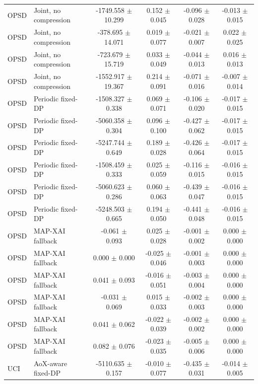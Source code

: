 \begin{table}[t]
\begin{tabular}{llcccc}
OPSD & Joint, no compression & -1749.558 $\pm$ 10.299 & 0.152 $\pm$ 0.045 & -0.096 $\pm$ 0.028 & -0.013 $\pm$ 0.015 \\
OPSD & Joint, no compression & -378.695 $\pm$ 14.071 & 0.019 $\pm$ 0.077 & -0.021 $\pm$ 0.007 & 0.022 $\pm$ 0.025 \\
OPSD & Joint, no compression & -723.679 $\pm$ 15.719 & 0.033 $\pm$ 0.049 & -0.044 $\pm$ 0.013 & 0.016 $\pm$ 0.013 \\
OPSD & Joint, no compression & -1552.917 $\pm$ 19.367 & 0.214 $\pm$ 0.091 & -0.071 $\pm$ 0.016 & -0.007 $\pm$ 0.014 \\
OPSD & Periodic fixed-DP & -1508.327 $\pm$ 0.338 & 0.069 $\pm$ 0.071 & -0.106 $\pm$ 0.020 & -0.017 $\pm$ 0.015 \\
OPSD & Periodic fixed-DP & -5060.358 $\pm$ 0.304 & 0.096 $\pm$ 0.100 & -0.427 $\pm$ 0.062 & -0.017 $\pm$ 0.015 \\
OPSD & Periodic fixed-DP & -5247.744 $\pm$ 0.649 & 0.189 $\pm$ 0.028 & -0.426 $\pm$ 0.064 & -0.017 $\pm$ 0.015 \\
OPSD & Periodic fixed-DP & -1508.459 $\pm$ 0.333 & 0.025 $\pm$ 0.059 & -0.116 $\pm$ 0.015 & -0.016 $\pm$ 0.015 \\
OPSD & Periodic fixed-DP & -5060.623 $\pm$ 0.286 & 0.060 $\pm$ 0.063 & -0.439 $\pm$ 0.047 & -0.016 $\pm$ 0.015 \\
OPSD & Periodic fixed-DP & -5248.503 $\pm$ 0.665 & 0.194 $\pm$ 0.050 & -0.441 $\pm$ 0.048 & -0.016 $\pm$ 0.015 \\
OPSD & MAP-XAI fallback & -0.061 $\pm$ 0.093 & 0.025 $\pm$ 0.028 & -0.001 $\pm$ 0.002 & 0.000 $\pm$ 0.000 \\
OPSD & MAP-XAI fallback & 0.000 $\pm$ 0.000 & -0.025 $\pm$ 0.046 & -0.001 $\pm$ 0.003 & 0.000 $\pm$ 0.000 \\
OPSD & MAP-XAI fallback & 0.041 $\pm$ 0.093 & -0.016 $\pm$ 0.051 & -0.003 $\pm$ 0.004 & 0.000 $\pm$ 0.000 \\
OPSD & MAP-XAI fallback & -0.031 $\pm$ 0.069 & 0.015 $\pm$ 0.033 & -0.002 $\pm$ 0.003 & 0.000 $\pm$ 0.000 \\
OPSD & MAP-XAI fallback & 0.041 $\pm$ 0.062 & -0.022 $\pm$ 0.039 & -0.002 $\pm$ 0.002 & 0.000 $\pm$ 0.000 \\
OPSD & MAP-XAI fallback & 0.082 $\pm$ 0.076 & -0.023 $\pm$ 0.035 & -0.005 $\pm$ 0.006 & 0.000 $\pm$ 0.000 \\
UCI & AoX-aware fixed-DP & -5110.635 $\pm$ 0.157 & -0.010 $\pm$ 0.077 & -0.435 $\pm$ 0.031 & -0.014 $\pm$ 0.005 \\

\end{tabular}
\end{table}
